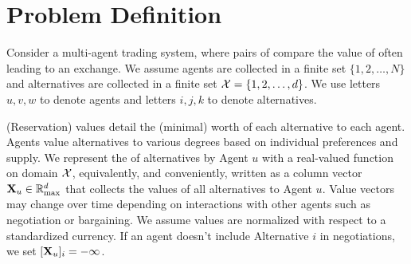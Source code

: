 \documentclass[letterpaper, 10 pt, conference]{ieeeconf}
\begin{document}

\section{Problem Definition}
\label{sec:problem}

Consider a multi-agent trading system, where pairs of  compare the value of  often leading to an exchange.
We assume agents are collected in a finite set $\{1,2,\dots, N\}$ and alternatives are collected in a finite set $\mathcal{X} = \{1,2,\dots,d\}$. We use letters $u,v,w$ to denote agents and letters $i,j,k$ to denote alternatives.

(Reservation) values detail the (minimal) worth of each alternative to each agent. Agents value alternatives to various degrees based on individual preferences and supply. We represent the  of alternatives by Agent $u$ with a real-valued function on domain $\mathcal{X}$, equivalently, and conveniently, written as a column vector $\mathbf{X}_u \in \mathbb{R}_{\mathrm{max}}^d$ that collects the values of all alternatives to Agent $u$. Value vectors may change over time depending on interactions with other agents such as negotiation or bargaining. We assume values are normalized with respect to a standardized currency. If an agent doesn't include Alternative $i$ in negotiations, we set $[\mathbf{X}_u]_i = -\infty$.
\end{document}

